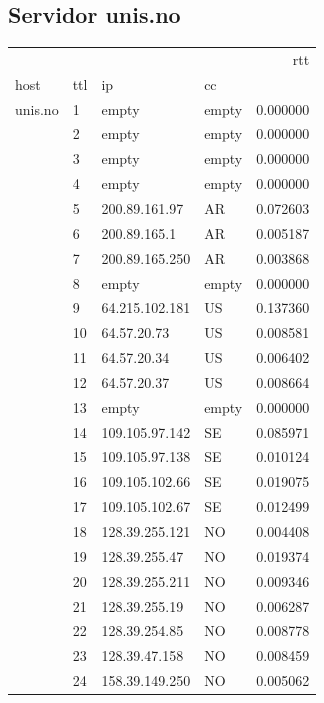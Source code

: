 \subsection{Servidor unis.no}
\begin{center}
\begin{tabular}{llllr}
\toprule
        &    &                &    &       rtt \\
host & ttl & ip & cc &           \\
\midrule
unis.no & 1  & empty & empty &  0.000000 \\
        & 2  & empty & empty &  0.000000 \\
        & 3  & empty & empty &  0.000000 \\
        & 4  & empty & empty &  0.000000 \\
        & 5  & 200.89.161.97 & AR &  0.072603 \\
        & 6  & 200.89.165.1 & AR &  0.005187 \\
        & 7  & 200.89.165.250 & AR &  0.003868 \\
        & 8  & empty & empty &  0.000000 \\
        & 9  & 64.215.102.181 & US &  0.137360 \\
        & 10 & 64.57.20.73 & US &  0.008581 \\
        & 11 & 64.57.20.34 & US &  0.006402 \\
        & 12 & 64.57.20.37 & US &  0.008664 \\
        & 13 & empty & empty &  0.000000 \\
        & 14 & 109.105.97.142 & SE &  0.085971 \\
        & 15 & 109.105.97.138 & SE &  0.010124 \\
        & 16 & 109.105.102.66 & SE &  0.019075 \\
        & 17 & 109.105.102.67 & SE &  0.012499 \\
        & 18 & 128.39.255.121 & NO &  0.004408 \\
        & 19 & 128.39.255.47 & NO &  0.019374 \\
        & 20 & 128.39.255.211 & NO &  0.009346 \\
        & 21 & 128.39.255.19 & NO &  0.006287 \\
        & 22 & 128.39.254.85 & NO &  0.008778 \\
        & 23 & 128.39.47.158 & NO &  0.008459 \\
        & 24 & 158.39.149.250 & NO &  0.005062 \\
\bottomrule
\end{tabular}

\end{center}
